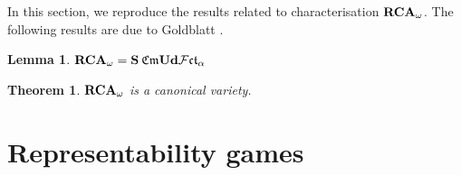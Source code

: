 \documentclass[a4paper]{article}
\theoremstyle{defin}
\theoremstyle{theorem}
\newtheorem{theorem}{Theorem}
\theoremstyle{prop}
\theoremstyle{lemma}
\newtheorem{lemma}{Lemma}
\theoremstyle{fact}
\theoremstyle{ex}
\theoremstyle{col}
\begin{document}
In this section, we reproduce the results related to characterisation ${\bf RCA}_{\omega}$. The following results are due to Goldblatt \cite{goldblatt1995elementary}.

\begin{lemma}
${\bf RCA}_{\omega} = {\bf S} \: \mathfrak{Cm} {\bf Ud} \mathcal{F} \mathfrak{ct}_{\alpha}$
\end{lemma}

\begin{theorem}
${\bf RCA}_{\omega}$ is a canonical variety.
\end{theorem}

\section{Representability games}



\end{document}
